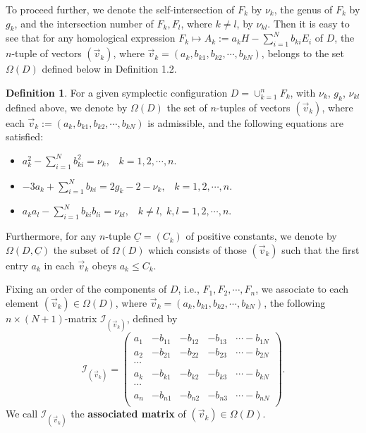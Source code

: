 \documentclass[11pt]{amsart}
\theoremstyle{plain}
\numberwithin{theorem}{section}
\theoremstyle{definition}
\newtheorem{definition}[theorem]{Definition}
\newcommand{\I}{{\mathcal I}}
\begin{document}
To proceed further, we denote the self-intersection of $F_k$ by $\nu_k$, the genus of $F_k$ by $g_k$, and the intersection number of $F_k,F_l$, where $k\neq l$, by $\nu_{kl}$. Then it is easy to see that for any homological expression $F_k\mapsto A_k:=a_kH-\sum_{i=1}^N b_{ki}E_i$ of $D$, the $n$-tuple of vectors $(\vec{v}_k)$,
where $\vec{v}_k=(a_k, b_{k1}, b_{k2}, \cdots, b_{kN})$, belongs to the set $\Omega(D)$ defined below 
in Definition 1.2.

\begin{definition}
For a given symplectic configuration $D=\cup_{k=1}^nF_k$, with $\nu_k$, $g_k$, $\nu_{kl}$ defined above, we denote by $\Omega(D)$ the set of $n$-tuples of vectors $(\vec{v}_k)$, where each $\vec{v}_k:=(a_k, b_{k1}, b_{k2}, \cdots, b_{kN})$ is admissible,  and the following equations are satisfied:
\begin{itemize}
\item [{(1)}] $a_k^2-\sum_{i=1}^N b_{ki}^2=\nu_k, \;\;\; k=1,2,\cdots,n$.
\item [{(2)}] $-3a_k+\sum_{i=1}^N b_{ki}=2g_k-2-\nu_k, \;\;\;  k=1,2,\cdots,n$.
\item [{(3)}] $a_ka_l-\sum_{i=1}^N b_{ki}b_{li}=\nu_{kl},\;\;\;  k\neq l, \; k,l=1,2,\cdots,n$.
\end{itemize}
Furthermore, for any $n$-tuple $\underline{C}=(C_k)$ of positive constants, we denote by 
$\Omega(D,\underline{C})$ the subset of $\Omega(D)$ which consists of those $(\vec{v}_k)$ such that the first entry $a_k$ in each $\vec{v}_k$ obeys $a_k\leq C_k$. 

Fixing an order of the components of $D$, i.e., $F_1, F_2, \cdots, F_n$,  we associate to each element 
$(\vec{v}_k)\in \Omega(D)$, where $\vec{v}_k=(a_k, b_{k1},b_{k2},\cdots, b_{kN})$, the following 
$n\times (N+1)$-matrix $\I_{(\vec{v}_k)}$, defined by 
$$
\I_{(\vec{v}_k)}=\left (\begin{array}{ccccc}
a_1 & -b_{11} & -b_{12} & -b_{13} & \cdots   -b_{1N} \\
a_2 & -b_{21} & -b_{22} & -b_{23} & \cdots  -b_{2N} \\
\cdots \\
a_k & -b_{k1} & -b_{k2} & -b_{k3} & \cdots  -b_{kN} \\
\cdots \\
a_n & -b_{n1} & -b_{n2} & -b_{n3} & \cdots -b_{nN} \\
\end{array}
\right ).
$$
We call $\I_{(\vec{v}_k)}$ the {\bf associated matrix} of $(\vec{v}_k)\in \Omega(D)$.
\end{definition}
\end{document}
